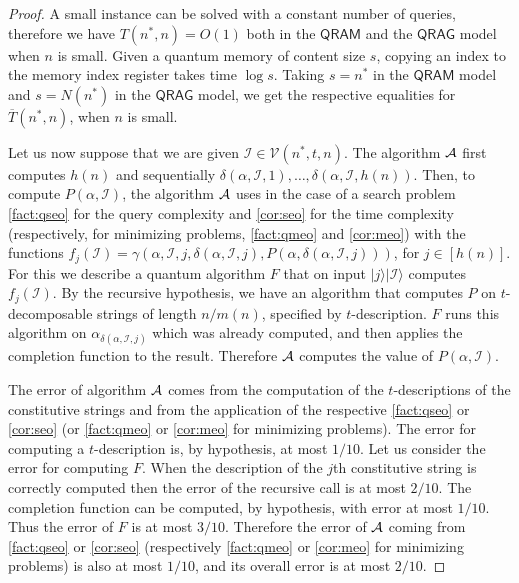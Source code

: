 \documentclass[12pt]{article}
\newcommand{\ket}[1]{|#1\rangle}
\theoremstyle{definition}
\begin{document}
\begin{proof}
A small instance can be solved with a constant number of queries, therefore we have $T(n^*,n)= O(1)$ both in the $\mathsf{QRAM}$ and the $\mathsf{QRAG}$ model when $n$ is small. Given a quantum memory of content size $s$, copying an index to the memory index register takes time $\log s$. Taking $s=n^*$ in the $\mathsf{QRAM}$ model and $s = N(n^*)$  in the $\mathsf{QRAG}$ model, we get the respective equalities for $\overline T(n^*,n)$, when $n$ is small. 

Let us now suppose that we are given $\mathcal{I} \in  \mathcal{V}(n^*,t,n)$.
The algorithm ${\cal A}$ first computes $h(n)$ and sequentially $\delta(\alpha, \mathcal{I}, 1), \ldots,  \delta(\alpha, \mathcal{I}, h(n))$.
Then, to compute $P(\alpha, \mathcal{I}) $, the algorithm ${\cal A}$ uses in the case of a search problem \cref{fact:qseo} for the query complexity and \cref{cor:seo} for the time complexity (respectively, for minimizing problems, \cref{fact:qmeo} and \cref{cor:meo}) with the functions $f_j(\mathcal{I}) =  \gamma(\alpha, \mathcal{I}, j, \delta(\alpha, \mathcal{I}, j), 
P(\alpha, \delta(\alpha, \mathcal{I}, j)))$, for $j \in [h(n)]$.
For this we describe a quantum algorithm $F$ that on input $\ket{j}\ket{\mathcal{I}}$ computes $f_j(\mathcal{I})$.
By the recursive hypothesis, we have an algorithm that computes $P$ on $t$-decomposable strings of length $n/m(n)$, specified by $t$-description. $F$ runs this algorithm on  $\alpha_{\delta(\alpha, \mathcal{I}, j)}$ which was already computed, and then applies the completion function to the result.
Therefore ${\cal A}$ computes the value of $P(\alpha, \mathcal{I}) $.

The error of algorithm ${\cal A}$ comes from the computation of the $t$-descriptions of the constitutive strings and from the application of the respective \cref{fact:qseo} or \cref{cor:seo} (or \cref{fact:qmeo} or \cref{cor:meo} for minimizing problems).
The error for computing a $t$-description is, by hypothesis, at most $1/10$. 
Let us consider the error for computing $F$. When the description of the $j$th constitutive string is correctly computed then 
the error of the recursive call is at most $2/10$. The completion function can be computed, by hypothesis, with error at most $1/10$.
Thus the error of $F$ is at most $3/10$. 
Therefore the error of ${\cal A}$ coming from \cref{fact:qseo} or \cref{cor:seo} (respectively \cref{fact:qmeo} or \cref{cor:meo} for minimizing problems) is also at most $1/10$, and its overall error is at most $2/10$.


\end{proof}
\end{document}

